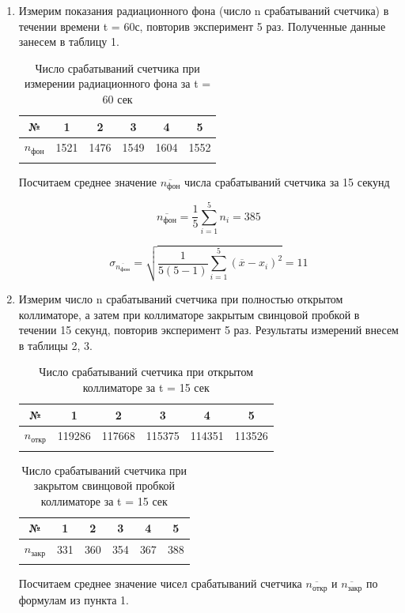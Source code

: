 \documentclass[a4paper, 12pt]{article}%
\begin{document}
	\begin{enumerate}
		
	\item Измерим показания радиационного фона (число n срабатываний счетчика) в течении времени t = 60с, повторив эксперимент 5 раз. Полученные данные занесем в таблицу 1.
			
	\begin{longtable}{|c|c|c|c|c|c|}
		\hline
		№ & 1 & 2 & 3 & 4 & 5\\ \hline
		$n_{\text{фон}}$ & 1521 & 1476 & 1549 & 1604 & 1552 \\ \hline
		\caption{Число срабатываний счетчика при измерении радиационного фона за t = 60 сек}
	\end{longtable}

	Посчитаем среднее значение $\overline{n_{\text{фон}}}$ числа срабатываний счетчика за 15 секунд
	
	$$\overline{n_{\text{фон}}} = \frac{1}{5} \sum_{i = 1}^{5} n_i = 385$$
	
	$$ \sigma_{\overline{n_{\text{фон}}}} = \sqrt{\frac{1}{5(5-1)} \sum_{i = 1}^{5} (\overline{x} - x_i)^2} = 11 $$
	
	\item Измерим число n срабатываний счетчика при полностью открытом коллиматоре, а затем при коллиматоре закрытым свинцовой пробкой в течении 15 секунд, повторив эксперимент 5 раз. Результаты измерений внесем в таблицы 2, 3.
	
	\begin{longtable}{|c|c|c|c|c|c|}
		\hline
		№ & 1 & 2 & 3 & 4 & 5\\ \hline
		$n_{\text{откр}}$ & 119286 & 117668 & 115375 & 114351 & 113526 \\ \hline
		\caption{Число срабатываний счетчика при открытом коллиматоре за t = 15 сек}
	\end{longtable}

	\begin{longtable}{|c|c|c|c|c|c|}
		\hline
		№ & 1 & 2 & 3 & 4 & 5\\ \hline
		$n_{\text{закр}}$ & 331 & 360 & 354 & 367 & 388 \\ \hline
		\caption{Число срабатываний счетчика при закрытом свинцовой пробкой коллиматоре за t = 15 сек}
	\end{longtable}

	Посчитаем среднее значение чисел срабатываний счетчика $\overline{n_{\text{откр}}}$ и $\overline{n_{\text{закр}}}$ по формулам из пункта 1.
			

\end{enumerate}
\end{document}
